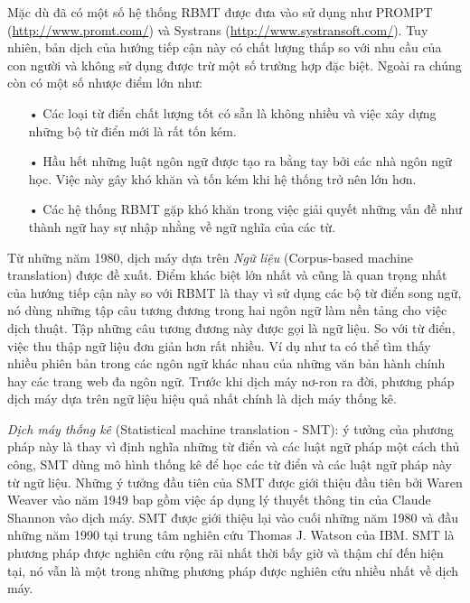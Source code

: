 Mặc dù đã có một số hệ thống RBMT được đưa vào sử dụng như PROMPT (\url{http://www.promt.com/}) và Systrans (\url{http://www.systransoft.com/}). Tuy nhiên, bản dịch của hướng tiếp cận này có chất lượng thấp so với nhu cầu của con người và không sử dụng được trừ một số trường hợp đặc biệt. Ngoài ra chúng còn có một số nhược điểm lớn như:
\begin{itemize}
	\item[•] Các loại từ điển chất lượng tốt có sẵn là không nhiều và việc xây dựng những bộ từ điển mới là rất tốn kém.
	\item[•] Hầu hết những luật ngôn ngữ được tạo ra bằng tay bởi các nhà ngôn ngữ học. Việc này gây khó khăn và tốn kém khi hệ thống trở nên lớn hơn.
	\item[•] Các hệ thống RBMT gặp khó khăn trong việc giải quyết những vấn đề như thành ngữ hay sự nhập nhằng về ngữ nghĩa của các từ. 
\end{itemize}
Từ những năm 1980, dịch máy dựa trên \textit{Ngữ liệu} (Corpus-based machine translation) được đề xuất. Điểm khác biệt lớn nhất và cũng là quan trọng nhất của hướng tiếp cận này so với RBMT là thay vì sử dụng các bộ từ điển song ngữ, nó dùng những tập câu tương đương trong hai ngôn ngữ làm nền tảng cho việc dịch thuật. Tập những câu tương đương này được gọi là ngữ liệu. So với từ điển, việc thu thập ngữ liệu đơn giản hơn rất nhiều. Ví dụ như ta có thể tìm thấy nhiều phiên bản trong các ngôn ngữ khác nhau của những văn bản hành chính hay các trang web đa ngôn ngữ. Trước khi dịch máy nơ-ron ra đời, phương pháp dịch máy dựa trên ngữ liệu hiệu quả nhất chính là dịch máy thống kê.

\textit{Dịch máy thống kê} (Statistical machine translation - SMT): ý tưởng của phương pháp này là thay vì định nghĩa những từ điển và các luật ngữ pháp một cách thủ công, SMT dùng mô hình thống kê để học các từ điển và các luật ngữ pháp này từ ngữ liệu. Những ý tưởng đầu tiên của SMT được giới thiệu đầu tiên bởi Waren Weaver vào năm 1949 bap gồm việc áp dụng lý thuyết thông tin của Claude Shannon vào dịch máy. SMT được giới thiệu lại vào cuối những năm 1980 và đầu những năm 1990 tại trung tâm nghiên cứu Thomas J. Watson của IBM. SMT là phương pháp được nghiên cứu rộng rãi nhất thời bấy giờ và thậm chí đến hiện tại, nó vẫn là một trong những phương pháp được nghiên cứu nhiều nhất về dịch máy. 

